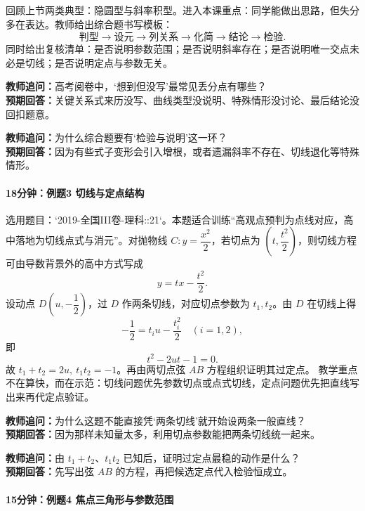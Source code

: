 \documentclass[UTF8,a4paper,11pt]{ctexart}
\begin{document}
回顾上节两类典型：隐圆型与斜率积型。进入本课重点：同学能做出思路，但失分多在表达。教师给出综合题书写模板：
\[
\text{判型}\rightarrow\text{设元}\rightarrow\text{列关系}\rightarrow\text{化简}\rightarrow\text{结论}\rightarrow\text{检验}.
\]
同时给出复核清单：是否说明参数范围；是否说明斜率存在；是否说明唯一交点未必是切线；是否说明定点与参数无关。

\noindent\textbf{教师追问：}高考阅卷中，‘想到但没写’最常见丢分点有哪些？\\

\textbf{预期回答：}关键关系式来历没写、曲线类型没说明、特殊情形没讨论、最后结论没回扣题意。\par

\noindent\textbf{教师追问：}为什么综合题要有‘检验与说明’这一环？\\

\textbf{预期回答：}因为有些式子变形会引入增根，或者遗漏斜率不存在、切线退化等特殊情形。\par

\paragraph{18分钟：例题3 切线与定点结构}

选用题目：`2019-全国III卷-理科::21`。本题适合训练“高观点预判为点线对应，高中落地为切线点式与消元”。对抛物线 $C:y=\dfrac{x^2}{2}$，若切点为 $(t,\dfrac{t^2}{2})$，则切线方程可由导数背景外的高中方式写成
\[
y=tx-\frac{t^2}{2}.
\]
设动点 $D(u,-\dfrac12)$，过 $D$ 作两条切线，对应切点参数为 $t_1,t_2$。由 $D$ 在切线上得
\[
-\frac12=t_i u-\frac{t_i^2}{2}
\quad (i=1,2),
\]
即
\[
t^2-2ut-1=0.
\]
故 $t_1+t_2=2u,\ t_1t_2=-1$。再由两切点弦 $AB$ 方程组织证明其过定点。
教学重点不在算快，而在示范：切线问题优先参数切点或点式切线，定点问题优先把直线写出来再代定点验证。

\noindent\textbf{教师追问：}为什么这题不能直接凭‘两条切线’就开始设两条一般直线？\\

\textbf{预期回答：}因为那样未知量太多，利用切点参数能把两条切线统一起来。\par

\noindent\textbf{教师追问：}由 $t_1+t_2$、$t_1t_2$ 已知后，证明过定点最稳的动作是什么？\\

\textbf{预期回答：}先写出弦 $AB$ 的方程，再把候选定点代入检验恒成立。\par

\paragraph{15分钟：例题4 焦点三角形与参数范围}
\end{document}
